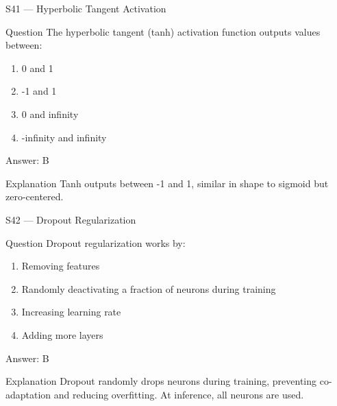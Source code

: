 \documentclass[aspectratio=169,8pt]{beamer}
\begin{document}
	\begin{frame}{S41 --- Hyperbolic Tangent Activation}
		\begin{block}{Question}
			The hyperbolic tangent (tanh) activation function outputs values between:
			\begin{enumerate}
				\item 0 and 1
				\item -1 and 1
				\item 0 and infinity
				\item -infinity and infinity
			\end{enumerate}
		\end{block}
		\begin{exampleblock}{Answer: B}\end{exampleblock}
		\begin{block}{Explanation}
			Tanh outputs between -1 and 1, similar in shape to sigmoid but zero-centered.
		\end{block}
	\end{frame}
	
	\begin{frame}{S42 --- Dropout Regularization}
		\begin{block}{Question}
			Dropout regularization works by:
			\begin{enumerate}
				\item Removing features
				\item Randomly deactivating a fraction of neurons during training
				\item Increasing learning rate
				\item Adding more layers
			\end{enumerate}
		\end{block}
		\begin{exampleblock}{Answer: B}\end{exampleblock}
		\begin{block}{Explanation}
			Dropout randomly drops neurons during training, preventing co-adaptation and reducing overfitting. At inference, all neurons are used.
		\end{block}
	\end{frame}
	
\end{document}

